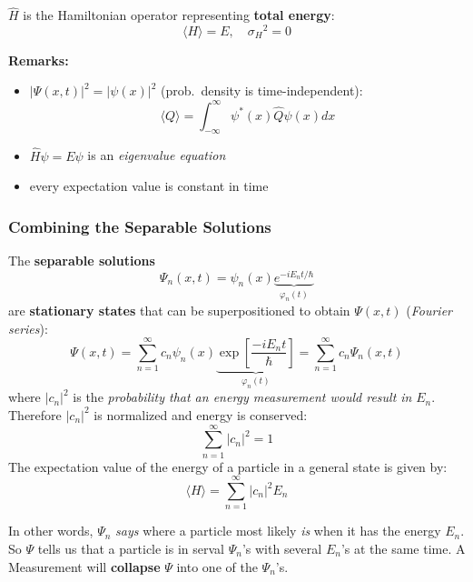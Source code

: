 
$\widehat{H}$ is the Hamiltonian operator representing \textbf{total energy}:
\noindent\begin{equation*}
    \langle H\rangle = E,\quad{\sigma_H}^2 = 0
\end{equation*}

\newpar{}

\textbf{Remarks:}
\begin{itemize}
    \item $|\Psi(x,t)|^2 = |\psi(x)|^2$ (prob.\ density is time-independent):
          \noindent\begin{equation*}
              \langle Q\rangle=\int_{-\infty}^\infty\psi^*(x)\hat{Q}\psi(x)dx
          \end{equation*}
    \item $\widehat{H}\psi = E\psi$ is an \textit{eigenvalue equation}
    \item every expectation value is constant in time
\end{itemize}

\subsubsection{Combining the Separable Solutions}
The \textbf{separable solutions}
\noindent\begin{equation*}
    \Psi_n(x,t)=\psi_n(x)\underbrace{e^{-iE_n t/\hbar}}_{\varphi_n(t)}
\end{equation*}
are \textbf{stationary states} that can be superpositioned to obtain $\Psi(x,t)$ (\textit{Fourier series}):
\noindent\begin{equation*}
    \Psi(x,t) =\sum_{n=1}^\infty c_n\psi_n(x) \underbrace{\exp\left[\frac{-iE_n t}{\hbar}\right]}_{\varphi_n(t)}=\sum_{n=1}^\infty c_n\Psi_n(x,t)
\end{equation*}
where $|c_n|^2$ is the \textit{probability that an energy measurement would result in} $E_n$. Therefore $|c_n|^2$ is normalized and energy is conserved:
\noindent\begin{equation*}
    \sum_{n=1}^\infty|c_n|^2 =1
\end{equation*}
The expectation value of the energy of a particle in a general state is given by:
\noindent\begin{equation*}
    \langle H\rangle=\sum_{n=1}^\infty|c_n|^2E_n
\end{equation*}

In other words, $\Psi_n$ \textit{says} where a particle most likely \textit{is} when it has the energy $E_n$. So $\Psi$ tells us that a particle is in serval $\Psi_n$'s with several $E_n$'s at the same time. A Measurement will \textbf{collapse} $\Psi$ into one of the $\Psi_n$'s.

